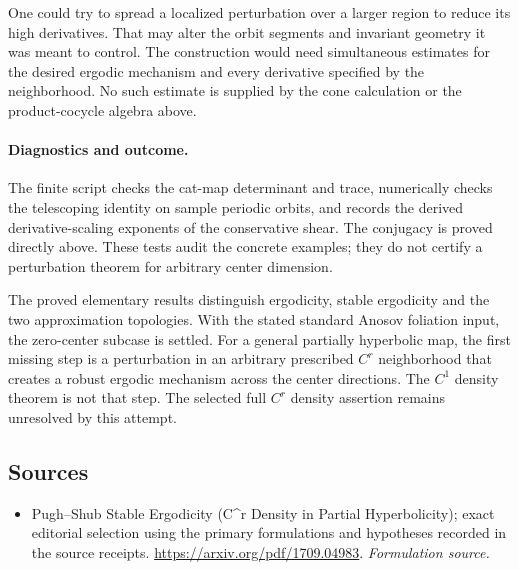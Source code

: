 \documentclass[11pt]{article}
\begin{document}
One could try to spread a localized perturbation over a larger
region to reduce its high derivatives. That may alter the orbit
segments and invariant geometry it was meant to control. The
construction would need simultaneous estimates for the desired
ergodic mechanism and every derivative specified by the neighborhood.
No such estimate is supplied by the cone calculation or the
product-cocycle algebra above.

\paragraph{Diagnostics and outcome.}
The finite script checks the cat-map determinant and trace,
numerically checks the telescoping identity on sample periodic
orbits, and records the derived derivative-scaling exponents of
the conservative shear. The conjugacy is proved directly above.
These tests audit the concrete examples;
they do not certify a perturbation theorem for arbitrary center
dimension.

The proved elementary results distinguish ergodicity, stable
ergodicity and the two approximation topologies. With the stated
standard Anosov foliation input, the zero-center subcase is settled.
For a general partially hyperbolic map, the first missing step is
a perturbation in an arbitrary prescribed $C^r$ neighborhood that
creates a robust ergodic mechanism across the center directions.
The $C^1$ density theorem is not that step. The selected full
$C^r$ density assertion remains unresolved by this attempt.
\subsection{Sources}
\begin{itemize}
\item[S1]Pugh–Shub Stable Ergodicity (C\textasciicircum{}r Density in Partial Hyperbolicity); exact editorial selection using the primary formulations and hypotheses recorded in the source receipts.
\url{https://arxiv.org/pdf/1709.04983}.
\textit{Formulation source.}
\end{itemize}
\end{document}
